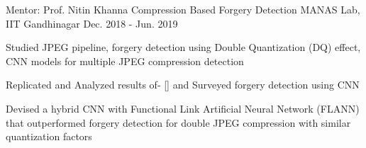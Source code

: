 \begin{cventries}



  \cventry
    {Mentor: Prof. Nitin Khanna} %
    {Compression Based Forgery Detection } %
    {MANAS Lab, IIT Gandhinagar} %
    {Dec. 2018 - Jun. 2019} %
    {
      \begin{cvitems} %
        \item {Studied JPEG pipeline, forgery detection using Double Quantization (DQ) effect, CNN models for multiple JPEG compression detection}
        \item {Replicated and Analyzed results of- [] and Surveyed forgery detection using CNN}
        \item {Devised a hybrid CNN with Functional Link Artificial Neural Network (FLANN) that outperformed forgery detection for double JPEG compression with similar quantization factors}
      \end{cvitems}
    }


\end{cventries}
